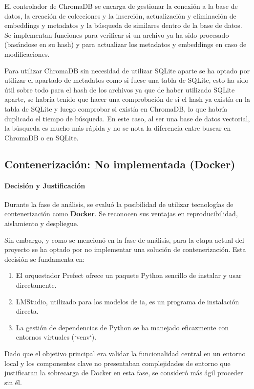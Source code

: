 El controlador de ChromaDB se encarga de gestionar la conexión a la base de datos, la creación de colecciones y la inserción, actualización y eliminación de embeddings y metadatos y la búsqueda de similares dentro de la base de datos. Se implementan funciones para verificar si un archivo ya ha sido procesado (basándose en su hash) y para actualizar los metadatos y embeddings en caso de modificaciones.

Para utilizar ChromaDB sin necesidad de utilizar SQLite aparte se ha optado por utilizar el apartado de metadatos como si fuese una tabla de SQLite, esto ha sido útil sobre todo para el hash de los archivos ya que de haber utilizado SQLite aparte, se habría tenido que hacer una comprobación de si el hash ya existía en la tabla de SQLite y luego comprobar si existía en ChromaDB, lo que habría duplicado el tiempo de búsqueda. En este caso, al ser una base de datos vectorial, la búsqueda es mucho más rápida y no se nota la diferencia entre buscar en ChromaDB o en SQLite.

\subsection{Contenerización: No implementada (Docker)}
\label{subsec:decision_docker}
\paragraph{Decisión y Justificación}
Durante la fase de análisis, se evaluó la posibilidad de utilizar tecnologías de contenerización como \textbf{Docker}. Se reconocen sus ventajas en reproducibilidad, aislamiento y despliegue.

Sin embargo, y como se mencionó en la fase de análisis, para la etapa actual del proyecto se ha optado por no implementar una solución de contenerización. Esta decisión se fundamenta en:
\begin{enumerate}
    \item El orquestador Prefect ofrece un paquete Python sencillo de instalar y usar directamente.
    \item LMStudio, utilizado para los modelos de \gls{ia}, es un programa de instalación directa.
    \item La gestión de dependencias de Python se ha manejado eficazmente con entornos virtuales (`venv`).
\end{enumerate}
Dado que el objetivo principal era validar la funcionalidad central en un entorno local y los componentes clave no presentaban complejidades de entorno que justificaran la sobrecarga de Docker en esta fase, se consideró más ágil proceder sin él.

